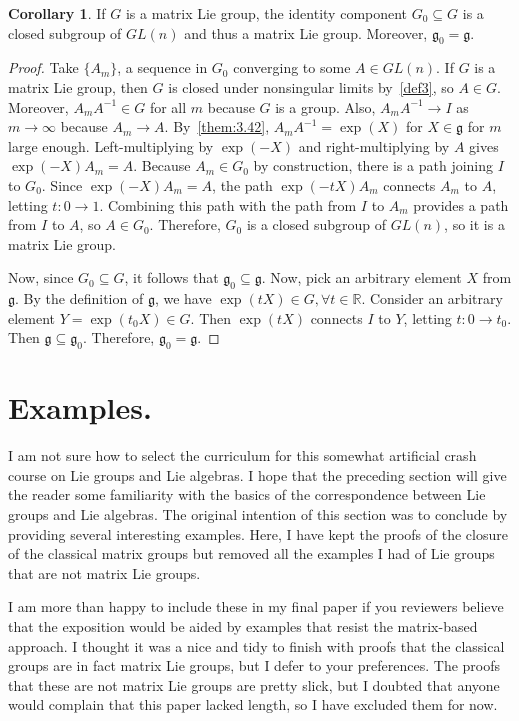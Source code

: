 \documentclass[12pt]{article}
\newcommand{\R}{\mathbb{R}}
\newcommand{\g}{\mathfrak{g}}
\theoremstyle{definition}
\theoremstyle{definition}
\newtheorem{cor}[them]{Corollary}
\theoremstyle{definition}
\theoremstyle{definition}
\theoremstyle{definition}
\theoremstyle{definition}
\theoremstyle{definition}
\theoremstyle{definition}
\begin{document}
\begin{cor}
    If $G$ is a matrix Lie group, the identity
    component $G_0 \subseteq G$ is a closed
    subgroup of $GL(n)$ and thus a matrix Lie
    group. Moreover, $\g_0 = \g$.
\end{cor}
\begin{proof}
\par{Take $\{A_m\}$, a sequence in $G_0$ converging to
some $A \in GL(n)$. If $G$ is a matrix Lie group,
then $G$ is closed under nonsingular limits
by~\ref{def3}, so $A \in G$. Moreover, $A_m
A^{-1} \in G$ for all $m$ because $G$ is a group.
Also, $A_m A^{-1} \to I$ as $m \to \infty$ because
$A_m \to A$. By~\ref{them:3.42}, $A_m A^{-1} =
\exp(X)$ for $X \in \g$ for $m$ large enough.
Left-multiplying by $\exp(-X)$ and
right-multiplying by $A$ gives $\exp(-X) A_m = A$.
Because $A_m \in G_0$ by construction, there is a
path joining $I$ to $G_0$. Since $\exp(-X)A_m =
A$, the path $\exp(-tX) A_m$ connects $A_m$ to
$A$, letting $t: 0 \to 1$. Combining this path
with the path from $I$ to $A_m$ provides a path
from $I$ to $A$, so $A \in G_0$. Therefore, $G_0$
is a closed subgroup of $GL(n)$, so it is a matrix
Lie group.}

\par{Now, since $G_0 \subseteq G$, it follows that
$\g_0 \subseteq \g$. Now, pick an arbitrary
element $X$ from $\g$. By the definition of $\g$,
we have $\exp(tX) \in G, \forall t \in \R$.
Consider an arbitrary element $Y = \exp(t_0X) \in
G$. Then $\exp(tX)$ connects $I$ to $Y$, letting
$t: 0 \to t_0$. Then $\g \subseteq \g_0$.
Therefore, $\g_0 = \g$.}
\end{proof}

\section{Examples.}

\par{I am not sure how to select the curriculum
for this somewhat artificial crash course on Lie
groups and Lie algebras. I hope that the preceding
section will give the reader some familiarity with
the basics of the correspondence between Lie
groups and Lie algebras. The original intention of
this section was to conclude by providing several
interesting examples. Here, I have kept the proofs
of the closure of the classical matrix groups but
removed all the examples I had of Lie groups that
are not matrix Lie groups.}

\par{I am more than happy to include these in my
final paper if you reviewers believe that the
exposition would be aided by examples that resist
the matrix-based approach. I thought it was a nice
and tidy to finish with proofs that the classical
groups are in fact matrix Lie groups, but I defer
to your preferences. The proofs that these are not
matrix Lie groups are pretty slick, but I doubted
that anyone would complain that this paper lacked
length, so I have excluded them for now.}
\end{document}

